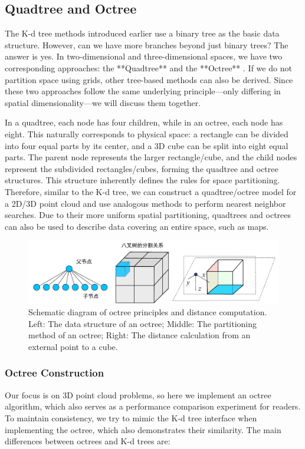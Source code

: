 \subsection{Quadtree and Octree}  

The K-d tree methods introduced earlier use a binary tree as the basic data structure. However, can we have more branches beyond just binary trees? The answer is yes. In two-dimensional and three-dimensional spaces, we have two corresponding approaches: the **Quadtree** \cite{Samet1984} and the **Octree** \cite{Meagher1982, Shaffer1987}. If we do not partition space using grids, other tree-based methods can also be derived. Since these two approaches follow the same underlying principle—only differing in spatial dimensionality—we will discuss them together.  

In a quadtree, each node has four children, while in an octree, each node has eight. This naturally corresponds to physical space: a rectangle can be divided into four equal parts by its center, and a 3D cube can be split into eight equal parts. The parent node represents the larger rectangle/cube, and the child nodes represent the subdivided rectangles/cubes, forming the quadtree and octree structures. This structure inherently defines the rules for space partitioning. Therefore, similar to the K-d tree, we can construct a quadtree/octree model for a 2D/3D point cloud and use analogous methods to perform nearest neighbor searches. Due to their more uniform spatial partitioning, quadtrees and octrees can also be used to describe data covering an entire space, such as maps.  

\begin{figure}[!htp]  
	\centering  
	\includegraphics[width=1.0\textwidth]{resources/basic-point-cloud/octo-tree.pdf}  
	\caption{Schematic diagram of octree principles and distance computation. Left: The data structure of an octree; Middle: The partitioning method of an octree; Right: The distance calculation from an external point to a cube.}  
	\label{fig:octo-tree}  
\end{figure}

\subsubsection{Octree Construction}
Our focus is on 3D point cloud problems, so here we implement an octree algorithm, which also serves as a performance comparison experiment for readers. To maintain consistency, we try to mimic the K-d tree interface when implementing the octree, which also demonstrates their similarity. The main differences between octrees and K-d trees are:

